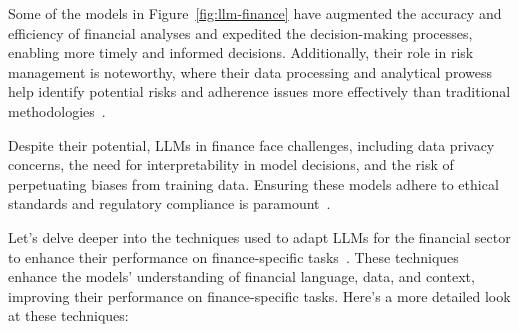 Some of the models in Figure~\ref{fig:llm-finance} have augmented the accuracy and efficiency of financial analyses and expedited the decision-making processes, enabling more timely and informed decisions.
Additionally, their role in risk management is noteworthy, where their data processing and analytical prowess help identify potential risks and adherence issues more effectively than traditional methodologies~\cite{buehler2018deep}.

Despite their potential, LLMs in finance face challenges, including data privacy concerns, the need for interpretability in model decisions, and the risk of perpetuating biases from training data.
Ensuring these models adhere to ethical standards and regulatory compliance is paramount~\cite{jones2020ethical, buehler2018deep}.

Let's delve deeper into the techniques used to adapt LLMs for the financial sector to enhance their performance on finance-specific tasks~\cite{lee2024survey}.
These techniques enhance the models' understanding of financial language, data, and context, improving their performance on finance-specific tasks.
Here's a more detailed look at these techniques:

